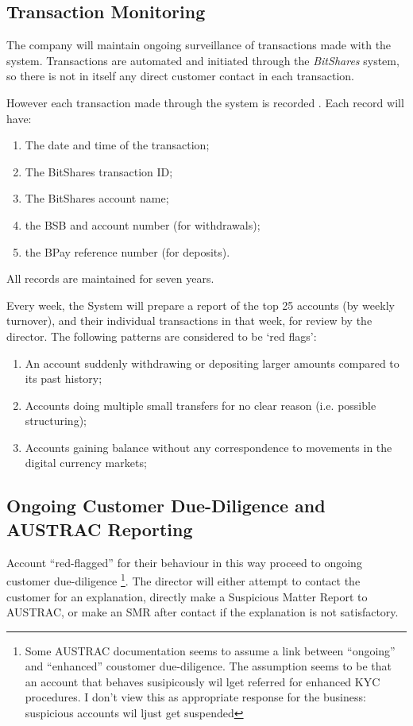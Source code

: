 \documentclass[12pt]{report}
\begin{document}
\subsection{Transaction Monitoring}

The company will maintain ongoing surveillance of transactions made with the system. Transactions are automated
and initiated through the \emph{BitShares} system, so there is not in itself any direct customer contact
in each transaction.

However each transaction made through the system is recorded . Each record will have:
\begin{enumerate}
  \item The date and time of the transaction;
  \item The BitShares transaction ID;
  \item The BitShares account name;
  \item the BSB and account number (for withdrawals);
  \item the BPay reference number (for deposits).
\end{enumerate}

All records are maintained for seven years.

Every week, the System will prepare a report of the top 25 accounts (by weekly turnover), and their individual transactions in that week,
for review by the director. The following patterns are considered to be `red flags':
\begin{enumerate}
\item An account suddenly withdrawing or depositing larger amounts compared to its past history;
\item Accounts doing multiple small transfers for no clear reason (i.e. possible structuring);
\item Accounts gaining balance without any correspondence to movements in the digital currency markets;
\end{enumerate}

\subsection{Ongoing Customer Due-Diligence and AUSTRAC Reporting}

Account ``red-flagged'' for their behaviour in this way proceed to ongoing customer due-diligence
\footnote{Some AUSTRAC documentation seems to assume a link between ``ongoing'' and ``enhanced'' coustomer due-diligence.
  The assumption seems to be that an account that behaves susipicously wil lget referred for enhanced KYC procedures. I
  don't view this as appropriate response for the business: suspicious accounts wil ljust get suspended}.
The director will either attempt to contact the customer for an explanation, directly make a Suspicious Matter Report to AUSTRAC,
or make an SMR after contact if the explanation is not satisfactory.
\end{document}
